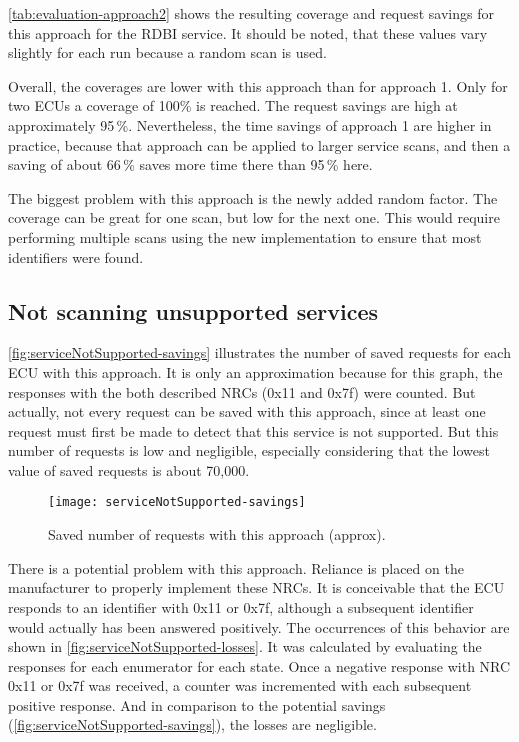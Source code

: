 \autoref{tab:evaluation-approach2} shows the resulting coverage and request savings for this approach for the RDBI service. It should be noted, that these values vary slightly for each run because a random scan is used.

Overall, the coverages are lower with this approach than for approach 1. Only for two ECUs a coverage of 100\% is reached. The request savings are high at approximately 95\,\%. Nevertheless, the time savings of approach 1 are higher in practice, because that approach can be applied to larger service scans, and then a saving of about 66\,\% saves more time there than 95\,\% here.

The biggest problem with this approach is the newly added random factor. The coverage can be great for one scan, but low for the next one. This would require performing multiple scans using the new implementation to ensure that most identifiers were found.

\subsection{Not scanning unsupported services}

\autoref{fig:serviceNotSupported-savings} illustrates the number of saved requests for each ECU with this approach. It is only an approximation because for this graph, the responses with the both described NRCs (0x11 and 0x7f) were counted. But actually, not every request can be saved with this approach, since at least one request must first be made to detect that this service is not supported. But this number of requests is low and negligible, especially considering that the lowest value of saved requests is about 70,000.

\begin{figure}[htb]
    \centering
    \texttt{[image: serviceNotSupported-savings]}
    \caption{Saved number of requests with this approach (approx).}
    \label{fig:serviceNotSupported-savings}
\end{figure}

There is a potential problem with this approach. Reliance is placed on the manufacturer to properly implement these NRCs. It is conceivable that the ECU responds to an identifier with 0x11 or 0x7f, although a subsequent identifier would actually has been answered positively. The occurrences of this behavior are shown in \autoref{fig:serviceNotSupported-losses}. It was calculated by evaluating the responses for each enumerator for each state. Once a negative response with NRC 0x11 or 0x7f was received, a counter was incremented with each subsequent positive response.
And in comparison to the potential savings (\autoref{fig:serviceNotSupported-savings}), the losses are negligible.

